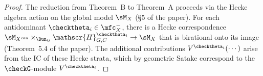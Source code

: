 \begin{proof}
  The reduction from Theorem~B to Theorem~A proceeds via the Hecke algebra action on the
  global model \( \sM_X \) (§5 of the paper).
  For each antidominant \( \checktheta_i \in \mfc_X^- \), there is a Hecke correspondence
  \( \sM_{X^{\mathrm{can}}} \times_{\Bun_G} \mathscr{H}^{\checktheta_i}_{G,C} \to \sM_X \)
  that is birational onto its image (Theorem~5.4 of the paper).
  The additional contributions \( V^{\checktheta_i}(\cdots) \) arise from the IC of these
  Hecke strata, which by geometric Satake correspond to the \( \checkG \)-module
  \( V^{\checktheta_i} \).
\end{proof}

